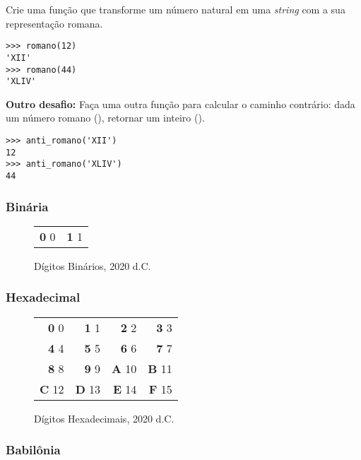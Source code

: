 	\quest Crie uma função que transforme um número natural em uma \textit{string} com a sua representação romana.
	
	\begin{lstlisting}
>>> romano(12)
'XII'
>>> romano(44)
'XLIV'
	\end{lstlisting}

	\textbf{Outro desafio:} Faça uma outra função para calcular o caminho contrário: dada um número romano (), retornar um inteiro ().

	\begin{lstlisting}
>>> anti_romano('XII')
12
>>> anti_romano('XLIV')
44
	\end{lstlisting}
	

	\subsubsection*{Binária}
	
	\begin{figure}[H]
	\centering
	\begin{tabular}{rr}
	\textbf{0} \phantom{0}0 & \textbf{1} \phantom{0}1
	\end{tabular}
	\caption{Dígitos Binários, 2020 d.C.}
	\end{figure}
	
	\subsubsection*{Hexadecimal}
	
	\begin{figure}[H]
	\centering
	\begin{tabular}{rrrr}
	\textbf{0} \phantom{1}0 & \textbf{1} \phantom{1}1 & \textbf{2} \phantom{1}2 & \textbf{3} \phantom{1}3\\
	\textbf{4} \phantom{1}4 & \textbf{5} \phantom{1}5 & \textbf{6} \phantom{1}6 & \textbf{7} \phantom{1}7\\
	\textbf{8} \phantom{1}8 & \textbf{9} \phantom{1}9 & \textbf{A} 10 & \textbf{B} 11\\
	\textbf{C} 12 & \textbf{D} 13 & \textbf{E} 14 & \textbf{F} 15
	\end{tabular}
	\caption{Dígitos Hexadecimais, 2020 d.C.}
	\end{figure}
			
	
	\subsubsection*{Babilônia}
	
